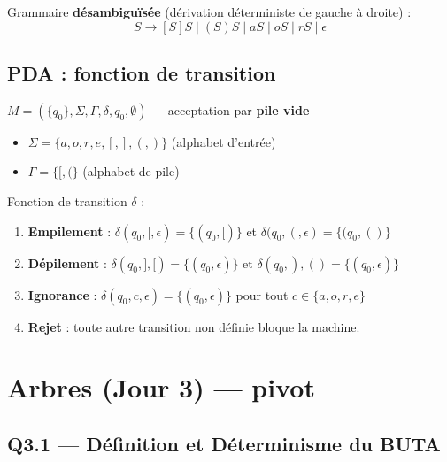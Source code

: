 \documentclass[12pt,a4paper,oneside]{scrartcl}
\begin{document}
Grammaire \textbf{désambiguïsée} (dérivation déterministe de gauche à droite) :
$$S \to [S]S \mid (S)S \mid aS \mid oS \mid rS \mid \epsilon$$

\subsection{PDA : fonction de transition}

\begin{definitionbox}
$M = (\{q_0\}, \Sigma, \Gamma, \delta, q_0, \emptyset)$ — acceptation par \textbf{pile vide}
\begin{itemize}
    \item $\Sigma = \{a, o, r, e, [, ], (, )\}$ \quad (alphabet d'entrée)
    \item $\Gamma = \{[, (\}$ \quad (alphabet de pile)
\end{itemize}
\end{definitionbox}

Fonction de transition $\delta$ :
\begin{enumerate}
    \item \textbf{Empilement} : $\delta(q_0, [, \epsilon) = \{(q_0, [)\}$ \quad et \quad $\delta(q_0, (, \epsilon) = \{(q_0, ()\}$
    \item \textbf{Dépilement} : $\delta(q_0, ], [) = \{(q_0, \epsilon)\}$ \quad et \quad $\delta(q_0, ), () = \{(q_0, \epsilon)\}$
    \item \textbf{Ignorance} : $\delta(q_0, c, \epsilon) = \{(q_0, \epsilon)\}$ \quad pour tout $c \in \{a, o, r, e\}$
    \item \textbf{Rejet} : toute autre transition non définie bloque la machine.
\end{enumerate}

\newpage

\section{Arbres (Jour 3) — pivot}

\subsection{Q3.1 — Définition et Déterminisme du BUTA}
\end{document}
